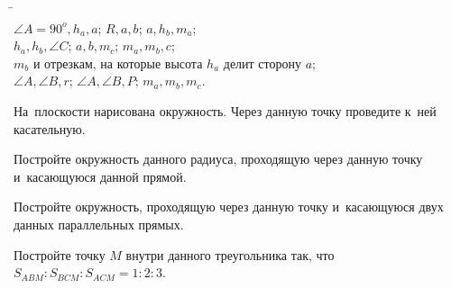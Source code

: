 \begin{problems}

\item\begin{tabbing}
\hspace{0.30\linewidth}\=
\hspace{0.30\linewidth}\=
\\
\subproblem $\angle A=90^o, h_{a}, a$;
\>
\subproblem $R, a, b$;
\>
\subproblem $a, h_{b}, m_{a}$;
\\
\subproblem $h_{a}, h_{b}, \angle C$;
\>
\subproblem $a, b, m_{c}$;
\>
\subproblem $m_{a}, m_{b}, c$;
\\
\subproblem $m_{b}$ и отрезкам, на которые высота $h_{a}$ делит сторону $a$;
\\
\subproblem $\angle A, \angle B, r$;
\>
\subproblem $\angle A, \angle B, P$;
\>
\subproblem $m_{a}, m_{b}, m_{c}$.
\end{tabbing}



\item
На~плоскости нарисована окружность.
Через данную точку проведите к~ней касательную.

\item
Постройте окружность данного радиуса, проходящую через данную точку
и~касающуюся данной прямой.

\item
Постройте окружность, проходящую через данную точку и~касающуюся двух данных
параллельных прямых.

\item
Постройте точку $M$ внутри данного треугольника так, что
$S_{ABM} : S_{BCM} : S_{ACM} = 1 : 2 : 3$.

\end{problems}

